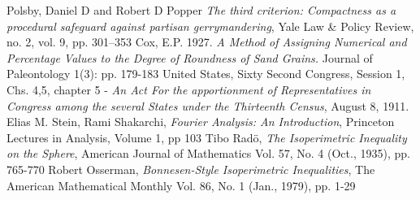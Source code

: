 \begin{thebibliography}{6}
   Polsby, Daniel D and Robert D Popper {\it The third criterion: Compactness as a procedural
  safeguard against partisan gerrymandering}, Yale Law \& Policy Review, no. 2, vol. 9, pp. 301–353
   Cox, E.P. 1927. {\it A Method of Assigning Numerical and Percentage Values to the Degree of Roundness of Sand Grains.} Journal of Paleontology 1(3): pp. 179-183
   United States, Sixty Second Congress, Session 1, Chs. 4,5, chapter 5 - {\it An Act For the apportionment of Representatives in Congress among the several States under the Thirteenth Census}, August 8, 1911.
   Elias M. Stein, Rami Shakarchi, {\it Fourier Analysis: An Introduction}, Princeton Lectures in Analysis, Volume 1, pp 103
   Tibo Rad\"{o}, {\it The Isoperimetric Inequality 
    on the Sphere}, American Journal of Mathematics
Vol. 57, No. 4 (Oct., 1935), pp. 765-770
   Robert Osserman, {\it Bonnesen-Style Isoperimetric 
    Inequalities}, The American Mathematical Monthly
Vol. 86, No. 1 (Jan., 1979), pp. 1-29
\end{thebibliography}
